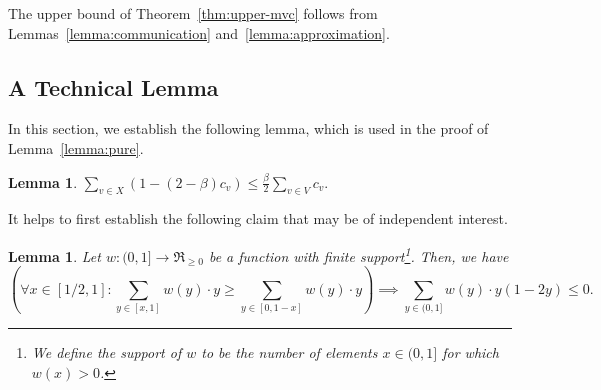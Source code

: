 \documentclass[11pt]{article}
\newtheorem{lemma}[theorem]{Lemma}
\begin{document}
The upper bound of Theorem~\ref{thm:upper-mvc} follows from
Lemmas~\ref{lemma:communication} and~\ref{lemma:approximation}.



\subsection{A Technical Lemma}
\label{sec:technical}
In this section, we establish the following lemma, which is used in
the proof of Lemma~\ref{lemma:pure}.
\begin{lemma}
  \label{claim:vertex cover weight}
$\sum_{v\in X} (1- (2-\beta) c_v)\leq \frac{\beta}{2}\sum_{v\in V} c_v.$
\end{lemma}
It helps to first establish the following claim that may be of independent interest.  
\begin{lemma}
  \label{lem:middle region}
Let $w: (0,1] \rightarrow \Re_{\ge 0}$ be a function with finite
  support\footnote{We define the support of $w$ to be the number of
    elements $x \in (0,1]$ for which $w(x) > 0$.}.  Then, we have
\[
\left(\forall x \in [1/2, 1]: \sum_{y \in [x,1]} w(y) \cdot y \ge \sum_{y \in [0,1-x]} w(y) \cdot y\right) \implies
\sum_{y \in (0,1]} w(y) \cdot y (1 - 2y) \le 0.
\]
\end{lemma}
\end{document}
